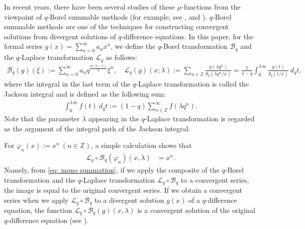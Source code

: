 \documentclass[a4paper]{article}
\newcommand{\Zz}{\mathbb{Z}}
\numberwithin{equation}{section}
\theoremstyle{plain}
\begin{document}
In recent years, there have been several studies of these $\mu$-functions from the viewpoint of $q$-Borel summable methods (for example, see \cite{GW}, \cite{ST1} and \cite{ST2}). 
$q$-Borel summable methods are one of the techniques for constructing convergent solutions from divergent solutions of $q$-difference equations. 
In this paper, for the formal series $g(x)=\sum_{n=0}^\infty a_n x^n$, we define the $q$-Borel transformation $\mathcal{B}_q$ and the $q$-Laplace transformation $\mathcal{L}_q$ as follows: 
\begin{align}
\label{eq: q-Borel Laplace transformation}
\mathcal{B}_q(g)(\xi):=\sum_{n=0}^\infty a_nq^\frac{n(n-1)}{2}\xi^n,\quad \mathcal{L}_q(g)(x;\lambda):=\sum_{n\in\Zz}\frac{g(\lambda q^n)}{\theta_q(\lambda q^n/x)}=\frac{1}{1-q}\int_0^{\lambda \infty}\frac{g(t)}{\theta_q(t/x)}\ d_qt, 
\end{align}
where the integral in the last term of the $q$-Laplace transformation is called the Jackson integral and is defined as the following sum: 
\begin{align*}
\int_0^{\lambda\infty} f(t)\ d_qt:=(1-q)\sum_{n\in\Zz}^\infty f(\lambda q^n). 
\end{align*}
Note that the parameter $\lambda$ appearing in the $q$-Laplace transformation is regarded as the argument of the integral path of the Jackson integral. 

For $\varphi_n(x):=x^n\ (n\in\Zz)$, a simple calculation shows that
\begin{align}
\label{eq: mono summation}
\mathcal{L}_q\circ\mathcal{B}_q(\varphi_n)(x,\lambda)
  &=x^n. 
\end{align}
Namely, from \eqref{eq: mono summation}, if we apply the composite of the $q$-Borel transformation and the $q$-Laplace transformation $\mathcal{L}_q\circ\mathcal{B}_q$ to a convergent series, the image is equal to the original convergent series. 
If we obtain a convergent series when we apply $\mathcal{L}_q\circ\mathcal{B}_q$ to a divergent solution $g(x)$ of a $q$-difference equation, the function $\mathcal{L}_q\circ\mathcal{B}_q(g)(x,\lambda)$ is a convergent solution of the original $q$-difference equation (see \cite{RSZ}). 
\end{document}
